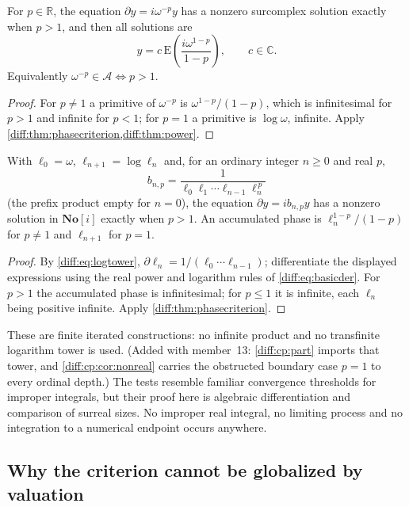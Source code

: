 \documentclass[11pt,letterpaper]{article}
\numberwithin{equation}{section}
\theoremstyle{definition}
\theoremstyle{remark}
\newcommand{\SC}{\mathbf{No}[i]}
\newcommand{\R}{\mathbb R}
\newcommand{\C}{\mathbb C}
\newcommand{\der}{\partial}
\newcommand{\Acl}{\mathcal A}
\newcommand{\Emm}{\mathrm{E}}
\begin{document}
\begin{corollary}
\label{diff:cor:power}
For $p\in\R$, the equation $\der y=i\omega^{-p}y$ has a nonzero surcomplex
solution exactly when $p>1$, and then all solutions are
\[
 y=c\,\Emm\!\left(\frac{i\omega^{1-p}}{1-p}\right),\qquad c\in\C .
\]
Equivalently $\omega^{-p}\in\Acl\iff p>1$.
\end{corollary}
\begin{proof}
For $p\neq1$ a primitive of $\omega^{-p}$ is $\omega^{1-p}/(1-p)$, which is
infinitesimal for $p>1$ and infinite for $p<1$; for $p=1$ a primitive is
$\log\omega$, infinite. Apply
\cref{diff:thm:phasecriterion,diff:thm:power}.
\end{proof}

\begin{corollary}
\label{diff:cor:logscales}
With $\ell_{0}=\omega$, $\ell_{n+1}=\log\ell_{n}$ and, for an ordinary integer
$n\geq0$ and real $p$,
\[
 b_{n,p}=\frac{1}{\ell_{0}\ell_{1}\cdots\ell_{n-1}\ell_{n}^{\,p}}
\]
(the prefix product empty for $n=0$), the equation $\der y=ib_{n,p}y$ has a
nonzero solution in $\SC$ exactly when $p>1$. An accumulated phase is
$\ell_{n}^{1-p}/(1-p)$ for $p\neq1$ and $\ell_{n+1}$ for $p=1$.
\end{corollary}
\begin{proof}
By \cref{diff:eq:logtower}, $\der\ell_{n}=1/(\ell_{0}\cdots\ell_{n-1})$;
differentiate the displayed expressions using the real power and logarithm
rules of \cref{diff:eq:basicder}. For $p>1$ the accumulated phase is
infinitesimal; for $p\leq1$ it is infinite, each $\ell_{n}$ being positive
infinite. Apply \cref{diff:thm:phasecriterion}.
\end{proof}

These are finite iterated constructions: no infinite product and no transfinite
logarithm tower is used. (Added with member~13: \cref{diff:cp:part} imports
that tower, and \cref{diff:cp:cor:nonreal} carries the obstructed boundary case
$p=1$ to every ordinal depth.) The tests resemble familiar convergence thresholds for
improper integrals, but their proof here is algebraic differentiation and
comparison of surreal sizes. No improper real integral, no limiting process
and no integration to a numerical endpoint occurs anywhere.

\subsection{Why the criterion cannot be globalized by valuation}
\label{diff:sub:noglobalvaluation}
\end{document}
